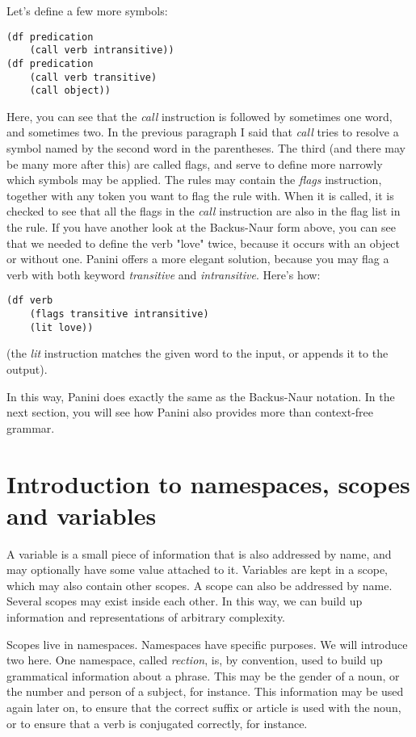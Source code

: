\documentclass{article}
\begin{document}
Let's define a few more symbols:
\begin{lstlisting}
(df predication
	(call verb intransitive))
(df predication
	(call verb transitive)
	(call object))
\end{lstlisting}
Here, you can see that the \emph{call} instruction is followed by sometimes one
word, and sometimes two. In the previous paragraph I said that \emph{call} tries
to resolve a symbol named by the second word in the parentheses. The third (and
there may be many more after this) are called flags, and serve to define more
narrowly which symbols may be applied. The rules may contain the \emph{flags} 
instruction, together with any token you want to flag the rule with. When it is
called, it is checked to see that all the flags in the \emph{call} instruction
are also in the flag list in the rule. If you have another look at the
Backus-Naur form above, you can see that we needed to define the verb "love"
twice, because it occurs with an object or without one. Panini offers a more
elegant solution, because you may flag a verb with both keyword
\emph{transitive} and \emph{intransitive}. Here's how:
\begin{lstlisting}
(df verb
	(flags transitive intransitive)
	(lit love))
\end{lstlisting}
(the \emph{lit} instruction matches the given word to the input, or appends it
to the output).

In this way, Panini does exactly the same as the Backus-Naur notation. In the
next section, you will see how Panini also provides
more than context-free grammar.

\section{Introduction to namespaces, scopes and variables}
A variable is a small piece of information that is also addressed by name, and
may optionally have some value attached to it. Variables are kept in a scope,
which may also contain other scopes. A scope can also be addressed by name.
Several scopes may exist inside each other. In this way, we can build up
information and representations of arbitrary complexity.

Scopes live in namespaces. Namespaces have specific purposes. We will introduce
two here. One namespace, called \emph{rection}, is, by convention, used to build
up grammatical information about a phrase. This may be the gender of a noun, or
the number and person of a subject, for instance. This information may be used
again later on, to ensure that the correct suffix or article is used with the
noun, or to ensure that a verb is conjugated correctly, for instance.
\end{document}
